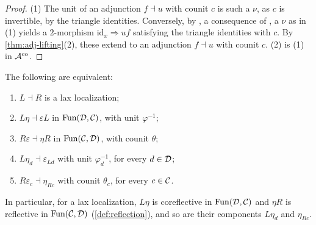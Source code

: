 \begin{proof}
%
(1) The unit of an adjunction $f \dashv u$ with counit $c$ is such a $\nu$,
as $c$ is invertible, by
the triangle identities. Conversely, by \cite[Cor.~2.2]{bourke2025recognition},
a consequence of \cite[Lemma~2.1.11]{riehlverity2022elements}, a $\nu$ as in
(1) yields a $2$-morphism
$\mathrm{id}_{x} \Rightarrow uf$
satisfying the triangle identities with $c$.
 By \cref{thm:adj-lifting}(2), these extend to an adjunction
$f \dashv u$ with counit $c$. (2) is (1) in
$\mathcal{A}^{\mathrm{co}}$.
\end{proof}

\begin{lem}
\label{lem:laxloc-equiv}
%
The following are equivalent:
\begin{enumerate}
\item $L \dashv R$ is a lax localization;
\item
$L\eta \dashv \varepsilon L$
in $\operatorname{Fun}(\mathcal{D},\mathcal{C})$, with unit $\varphi^{-1}$;
\item
$R\varepsilon \dashv \eta R$
in $\operatorname{Fun}(\mathcal{C},\mathcal{D})$, with counit $\theta$;
\item
$L\eta_{d} \dashv \varepsilon_{Ld}$
with unit $\varphi_{d}^{-1}$, for
every $d \in \mathcal{D}$;
\item
$R\varepsilon_{c} \dashv \eta_{Rc}$
with counit $\theta_{c}$, for every
$c \in \mathcal{C}$.
\end{enumerate}
In particular, for a lax localization, $L\eta$ is coreflective in
$\operatorname{Fun}(\mathcal{D},\mathcal{C})$ and $\eta R$ is reflective in $\operatorname{Fun}(\mathcal{C},\mathcal{D})$
(\cref{def:reflection}), and so are their components $L\eta_{d}$ and
$\eta_{Rc}$.
\end{lem}

